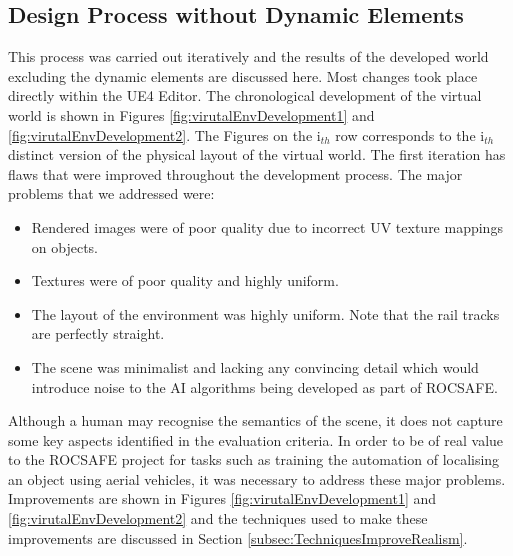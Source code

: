 \subsection{Design Process without Dynamic Elements}
This process was carried out iteratively and the results of the developed world excluding the dynamic elements are discussed here. Most changes took place directly within the UE4 Editor. The chronological development of the virtual world is shown in Figures \ref{fig:virutalEnvDevelopment1} and \ref{fig:virutalEnvDevelopment2}. The Figures on the i$_{th}$ row corresponds to the i$_{th}$ distinct version of the physical layout of the virtual world. The first iteration has flaws that were improved throughout the development process. The major problems that we addressed were:
\begin{itemize}
    \item Rendered images were of poor quality due to incorrect UV texture mappings %
    on objects.
    \item Textures were of poor quality and highly uniform.
    \item The layout of the environment was highly uniform. Note that the rail tracks are perfectly straight.
    \item The scene was minimalist and lacking any convincing detail which would introduce noise to the AI algorithms being developed as part of ROCSAFE.
\end{itemize}
Although a human may recognise the semantics of the scene, it does not capture some key aspects identified in the evaluation criteria. In order to be of real value to the ROCSAFE project for tasks such as training the automation of localising an object using aerial vehicles, it was necessary to address these major problems. Improvements are shown in Figures \ref{fig:virutalEnvDevelopment1} and \ref{fig:virutalEnvDevelopment2} and the techniques used to make these improvements are discussed in Section \ref{subsec:TechniquesImproveRealism}.


